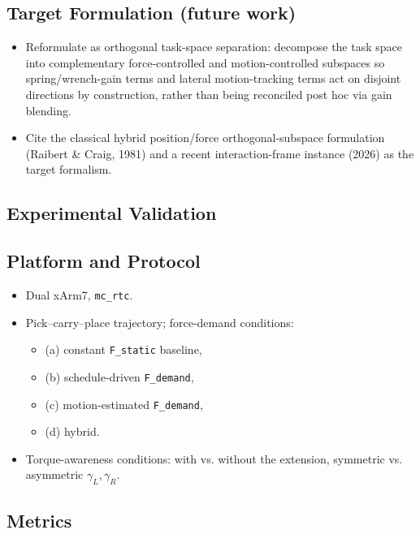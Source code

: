 \documentclass[conference]{IEEEtran}
\begin{document}
\subsection*{Target Formulation (future work)}
\begin{itemize}
    \item Reformulate as orthogonal task-space separation: decompose the task space into complementary force-controlled and motion-controlled subspaces so spring/wrench-gain terms and lateral motion-tracking terms act on disjoint directions by construction, rather than being reconciled post hoc via gain blending.

    \item Cite the classical hybrid position/force orthogonal-subspace formulation (Raibert \& Craig, 1981) and a recent interaction-frame instance (2026) as the target formalism.
\end{itemize}


\subsection*{Experimental Validation}



\subsection*{Platform and Protocol}

\begin{itemize}
    \item Dual xArm7, \texttt{mc\_rtc}.

    \item Pick--carry--place trajectory; force-demand conditions:
    \begin{itemize}
        \item (a) constant \texttt{F\_static} baseline,
        \item (b) schedule-driven \texttt{F\_demand},
        \item (c) motion-estimated \texttt{F\_demand},
        \item (d) hybrid.
    \end{itemize}

    \item Torque-awareness conditions: with vs. without the extension, symmetric vs. asymmetric \(\gamma_L,\gamma_R\).

\end{itemize}

\subsection*{Metrics}
\end{document}
